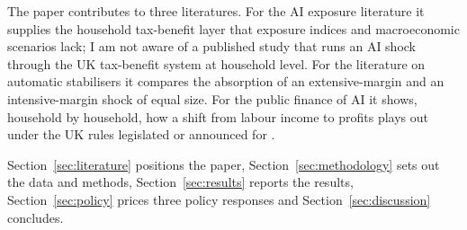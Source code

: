 The paper contributes to three literatures. For the AI exposure literature it supplies the household tax-benefit layer that exposure indices and macroeconomic scenarios lack; I am not aware of a published study that runs an AI shock through the UK tax-benefit system at household level. For the literature on automatic stabilisers \citep{dolls2012} it compares the absorption of an extensive-margin and an intensive-margin shock of equal size. For the public finance of AI \citep{korinek2026, obr2026frs} it shows, household by household, how a shift from labour income to profits plays out under the UK rules legislated or announced for \genSimTaxYear{}.

Section~\ref{sec:literature} positions the paper, Section~\ref{sec:methodology} sets out the data and methods, Section~\ref{sec:results} reports the results, Section~\ref{sec:policy} prices three policy responses and Section~\ref{sec:discussion} concludes.

